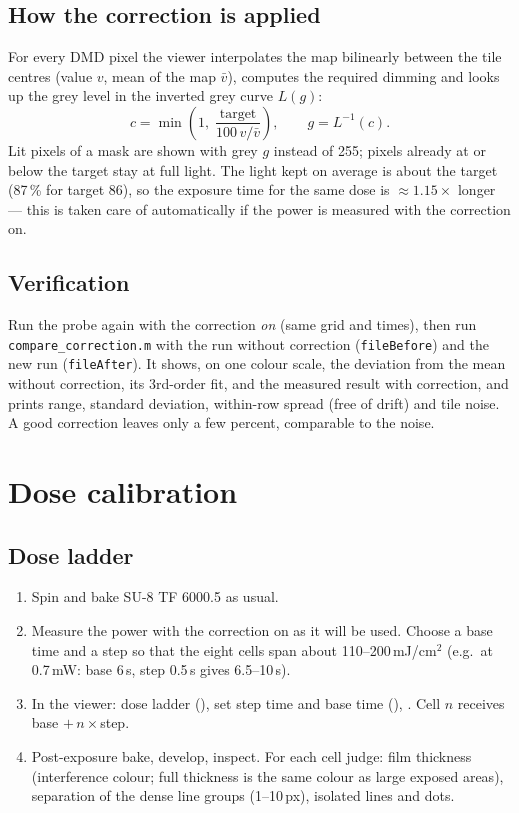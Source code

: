 \documentclass[11pt,a4paper]{article}
\newcommand{\key}[1]{\fbox{\footnotesize\texttt{#1}}}
\newcommand{\file}[1]{\texttt{#1}}
\begin{document}
\subsection{How the correction is applied}
For every DMD pixel the viewer interpolates the map bilinearly between the tile centres (value $v$, mean of the map
$\bar v$), computes the required dimming and looks up the grey level in the inverted grey curve $L(g)$:
\begin{equation}
  c = \min\!\left(1,\; \frac{\text{target}}{100\,v/\bar v}\right), \qquad g = L^{-1}(c).
\end{equation}
Lit pixels of a mask are shown with grey $g$ instead of 255; pixels already at or below the target stay at full light.
The light kept on average is about the target (87\,\% for target 86), so the exposure time for the same dose is
$\approx 1.15\times$ longer --- this is taken care of automatically if the power is measured with the correction on.

\subsection{Verification}
Run the probe again with the correction \emph{on} (same grid and times), then run \file{compare\_correction.m} with the
run without correction (\file{fileBefore}) and the new run (\file{fileAfter}). It shows, on one colour scale, the
deviation from the mean without correction, its 3rd-order fit, and the measured result with correction, and prints
range, standard deviation, within-row spread (free of drift) and tile noise. A good correction leaves only a few
percent, comparable to the noise.

\section{Dose calibration}
\label{sec:dose}
\subsection{Dose ladder}
\begin{enumerate}
  \item Spin and bake SU-8 TF 6000.5 as usual.
  \item Measure the power with the correction on as it will be used. Choose a base time and a step so that the eight
        cells span about 110--200\,mJ/cm$^2$ (e.g.\ at 0.7\,mW: base 6\,s, step 0.5\,s gives 6.5--10\,s).
  \item In the viewer: dose ladder (\key{D}), set step time and base time (\key{M}), \key{Space}. Cell $n$ receives
        base $+\,n\times$step.
  \item Post-exposure bake, develop, inspect. For each cell judge: film thickness (interference colour; full thickness
        is the same colour as large exposed areas), separation of the dense line groups (1--10\,px), isolated lines and
        dots.
\end{enumerate}
\end{document}
